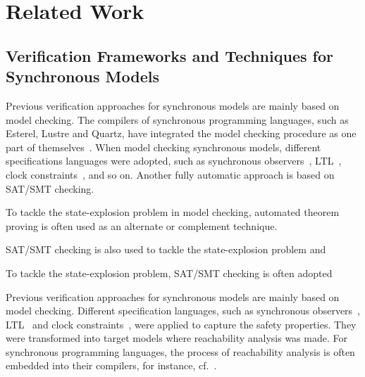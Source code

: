 \documentclass{fcs}
\begin{document}
\section{Related Work}
\label{section:Related Work}
\subsection{Verification Frameworks and Techniques for Synchronous Models}

\ifx
Previous verification approaches for synchronous models are mainly based on model checking.
The compilers of synchronous programming languages, such as Esterel, Lustre and Quartz, have integrated the model checking procedure as one part of themselves~\cite{???,???,???}.
When model checking synchronous models, different specifications languages were adopted, such as synchronous observers~\cite{synchronous observers and the verification of reactive systems,From a synchronous declarative language to a temporal logic dealing with multiform time}, LTL~\cite{???}, clock constraints~\cite{???,???}, and so on.
Another fully automatic approach is based on SAT/SMT checking.

To tackle the state-explosion problem in model checking, automated theorem proving is often used as an alternate or complement technique.


SAT/SMT checking is also used to tackle the state-explosion problem and

To tackle the state-explosion problem, SAT/SMT checking is often adopted
\fi

Previous verification approaches for synchronous models are mainly based on model checking.
Different specification languages, such as synchronous observers~\cite{Halbwachs93b,Pilaud88}, LTL~\cite{Jagadeesan95} and clock constraints~\cite{Andre09}, were applied to capture the safety properties. They were transformed into target models where reachability analysis was made.
For synchronous programming languages, the process of reachability analysis is often embedded into their compilers, for instance, cf.~\cite{Berry85,Halbwachs91}.
\end{document}
